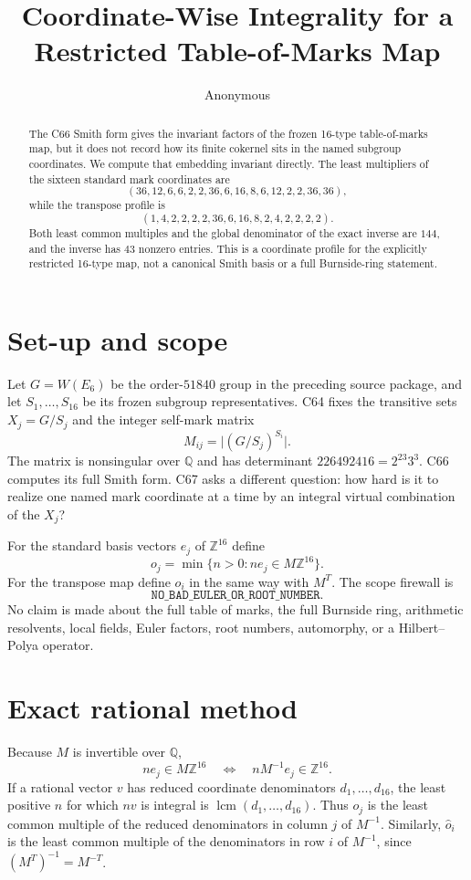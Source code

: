 \documentclass[10pt]{article}
\title{Coordinate-Wise Integrality for a Restricted Table-of-Marks Map}
\author{Anonymous}
\date{}
\newcommand{\W}{W(E_6)}
\newcommand{\Z}{\mathbb Z}
\newcommand{\Q}{\mathbb Q}
\begin{document}
\maketitle

\begin{abstract}
The C66 Smith form gives the invariant factors of the frozen 16-type
table-of-marks map, but it does not record how its finite cokernel sits in
the named subgroup coordinates.  We compute that embedding invariant
directly.  The least multipliers of the sixteen standard mark coordinates
are
\[
(36,12,6,6,2,2,36,6,16,8,6,12,2,2,36,36),
\]
while the transpose profile is
\[
(1,4,2,2,2,2,36,6,16,8,2,4,2,2,2,2).
\]
Both least common multiples and the global denominator of the exact inverse
are $144$, and the inverse has $43$ nonzero entries.  This is a coordinate
profile for the explicitly restricted 16-type map, not a canonical Smith
basis or a full Burnside-ring statement.
\end{abstract}

\section{Set-up and scope}
Let $G=\W$ be the order-$51840$ group in the preceding source package, and
let $S_1,\ldots,S_{16}$ be its frozen subgroup representatives.  C64 fixes
the transitive sets $X_j=G/S_j$ and the integer self-mark matrix
\[
 M_{ij}=\lvert (G/S_j)^{S_i}\rvert.
\]
The matrix is nonsingular over $\Q$ and has determinant
$226492416=2^{23}3^3$.  C66 computes its full Smith form.  C67 asks a
different question: how hard is it to realize one named mark coordinate at a
time by an integral virtual combination of the $X_j$?

For the standard basis vectors $e_j$ of $\Z^{16}$ define
\[
 o_j=\min\{n>0:n e_j\in M\Z^{16}\}.
\]
For the transpose map define $\widehat o_i$ in the same way with $M^T$.
The scope firewall is
\[
\texttt{NO\_BAD\_EULER\_OR\_ROOT\_NUMBER}.
\]
No claim is made about the full table of marks, the full Burnside ring,
arithmetic resolvents, local fields, Euler factors, root numbers, automorphy,
or a Hilbert--Polya operator.

\section{Exact rational method}
Because $M$ is invertible over $\Q$,
\[
 n e_j\in M\Z^{16}
 \quad\Longleftrightarrow\quad
 nM^{-1}e_j\in\Z^{16}.
\]
If a rational vector $v$ has reduced coordinate denominators
$d_1,\ldots,d_{16}$, the least positive $n$ for which $nv$ is integral is
$\operatorname{lcm}(d_1,\ldots,d_{16})$.  Thus $o_j$ is the least common
multiple of the reduced denominators in column $j$ of $M^{-1}$.  Similarly,
$\widehat o_i$ is the least common multiple of the denominators in row $i$
of $M^{-1}$, since $(M^T)^{-1}=M^{-T}$.
\end{document}
